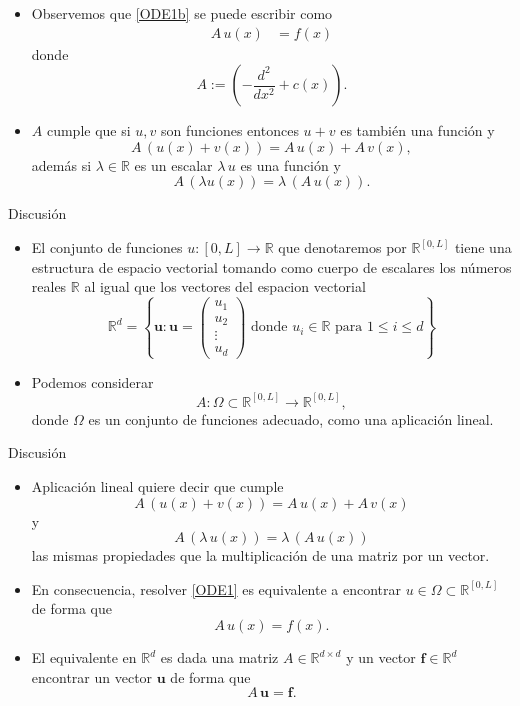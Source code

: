 \documentclass[10pt,handout]{beamer}
\theoremstyle{plain} %
\theoremstyle{plain} %
\theoremstyle{plain} %
\theoremstyle{plain} %
\theoremstyle{definition}
\theoremstyle{example}
\theoremstyle{example}
\theoremstyle{remark}
\theoremstyle{remark}
\begin{document}
\begin{frame}
\begin{itemize}
\item Observemos que \eqref{ODE1b} se puede escribir como
\begin{align*}
A \, u(x) & =  f(x)
\end{align*}
donde
$$
A:= \left(-\frac{d^2}{dx^2} + c(x) \right).
$$
\item $A$ cumple que si $u,v$ son funciones entonces $u+v$ es también
una función y
$$
A\,(u(x)+v(x)) = A\, u(x) + A\, v(x),
$$
además si $\lambda \in \mathbb{R}$ es un escalar $\lambda\, u$ es una función y
$$
A\,(\lambda u(x)) = \lambda\, (A\, u(x)).
$$
\end{itemize}
\end{frame}

\begin{frame}{Discusión}
\begin{itemize}
\item El conjunto de funciones $u:[0,L] \longrightarrow \mathbb{R}$ que denotaremos
por $\mathbb{R}^{[0,L]}$ tiene una estructura de espacio vectorial 
tomando como cuerpo de escalares los números reales $\mathbb{R}$ al igual 
que los vectores del espacion vectorial
$$
\mathbb{R}^d = \left\{\mathbf{u}: \mathbf{u}=
\left(
\begin{array}{c}
u_1 \\ 
u_2 \\ 
\vdots \\ 
u_d
\end{array} 
\right) \text{ donde } u_i \in \mathbb{R} \text{ para } 1 \le i \le d
\right\}
$$
\item Podemos considerar $$A: \Omega \subset \mathbb{R}^{[0,L]} \longrightarrow \mathbb{R}^{[0,L]},$$
donde $\Omega$ es un conjunto  de funciones adecuado, como una aplicación lineal.
\end{itemize}
\end{frame}

\begin{frame}{Discusión}
\begin{itemize}
\item Aplicación lineal quiere decir que cumple
$$
A\,(u(x)+v(x)) = A\,u(x) + A\, v(x)
$$
y
$$
A\,(\lambda\,u(x)) = \lambda\,(A\,u(x))
$$
las mismas propiedades que la multiplicación de una matriz por un vector.
\item En consecuencia, resolver \eqref{ODE1} es equivalente a encontrar $u \in \Omega \subset \mathbb{R}^{[0,L]}$ de forma que
$$
A \, u(x) = f(x).
$$
\item El equivalente en $\mathbb{R}^d$ es dada una matriz $A \in \mathbb{R}^{d \times d}$ y un vector 
$\mathbf{f} \in \mathbb{R}^d$ encontrar un vector $\mathbf{u}$ de forma que
$$
A\, \mathbf{u} = \mathbf{f}.
$$
\end{itemize}
\end{frame}
\end{document}
